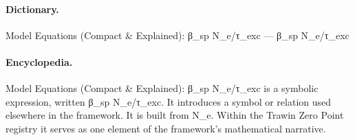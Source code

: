 \paragraph{Dictionary.}
Model Equations (Compact \& Explained): β\_sp N\_e/τ\_exc — β\_sp N\_e/τ\_exc

\paragraph{Encyclopedia.}
Model Equations (Compact \& Explained): β\_sp N\_e/τ\_exc is a symbolic expression, written β\_sp N\_e/τ\_exc. It introduces a symbol or relation used elsewhere in the framework. It is built from N\_e. Within the Trawin Zero Point registry it serves as one element of the framework's mathematical narrative.
